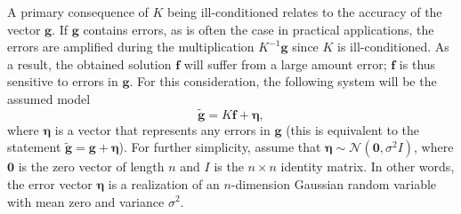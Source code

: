 \documentclass[12pt,notitlepage]{report}
\newcommand{\gVec}{\mathbf{g}}	%
\newcommand{\gnoiseVec}{\widetilde{\mathbf{g}}}	%
\newcommand{\kMat}{K}	%
\newcommand{\fVec}{\mathbf{f}}	%
\newcommand{\noise}{\eta}	%
\newcommand{\noiseSD}{\sigma}	%
\newcommand{\noiseVec}{\bm{\noise}}	%
\begin{document}
A primary consequence of $\kMat$ being ill-conditioned relates to the accuracy of the vector $\gVec$. If $\gVec$ contains errors, as is often the case in practical applications, the errors are amplified during the multiplication $\kMat^{-1}\gVec$ since $\kMat$ is ill-conditioned. As a result, the obtained solution $\fVec$ will suffer from a large amount error; $\fVec$ is thus sensitive to errors in $\gVec$. For this consideration, the following system will be the assumed model
\begin{equation}
\gnoiseVec = \kMat\fVec + \noiseVec,
\label{eq:DisNoise}
\end{equation}
where $\noiseVec$ is a vector that represents any errors in $\gVec$ (this is equivalent to the statement $\gnoiseVec = \gVec + \noiseVec$). For further simplicity, assume that $\noiseVec \sim \mathcal{N}(\bm{0},\noiseSD^2I)$, where $\bm{0}$ is the zero vector of length $n$ and $I$ is the $n \times n$ identity matrix. In other words, the error vector $\noiseVec$ is a realization of an $n$-dimension Gaussian random variable with mean zero and variance $\noiseSD^2$. 
\end{document}
